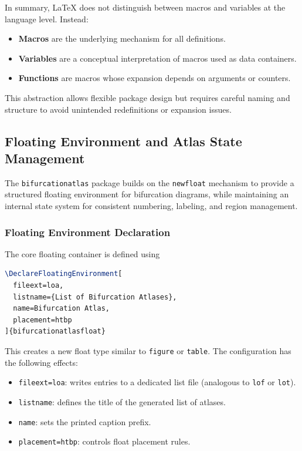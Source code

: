 In summary, \LaTeX{} does not distinguish between macros and variables at the language level. Instead:

\begin{itemize}
\item \textbf{Macros} are the underlying mechanism for all definitions.
\item \textbf{Variables} are a conceptual interpretation of macros used as data containers.
\item \textbf{Functions} are macros whose expansion depends on arguments or counters.
\end{itemize}

This abstraction allows flexible package design but requires careful naming and structure to avoid unintended redefinitions or expansion issues.

\subsection{Floating Environment and Atlas State Management}

The \texttt{bifurcationatlas} package builds on the \texttt{newfloat} mechanism to provide a structured floating environment for bifurcation diagrams, while maintaining an internal state system for consistent numbering, labeling, and region management.

\subsubsection{Floating Environment Declaration}

The core floating container is defined using

\begin{lstlisting}[language=LaTeX]
\DeclareFloatingEnvironment[
  fileext=loa,
  listname={List of Bifurcation Atlases},
  name=Bifurcation Atlas,
  placement=htbp
]{bifurcationatlasfloat}
\end{lstlisting}

This creates a new float type similar to \texttt{figure} or \texttt{table}. The configuration has the following effects:

\begin{itemize}
\item \texttt{fileext=loa}: writes entries to a dedicated list file (analogous to \texttt{lof} or \texttt{lot}).
\item \texttt{listname}: defines the title of the generated list of atlases.
\item \texttt{name}: sets the printed caption prefix.
\item \texttt{placement=htbp}: controls float placement rules.
\end{itemize}

